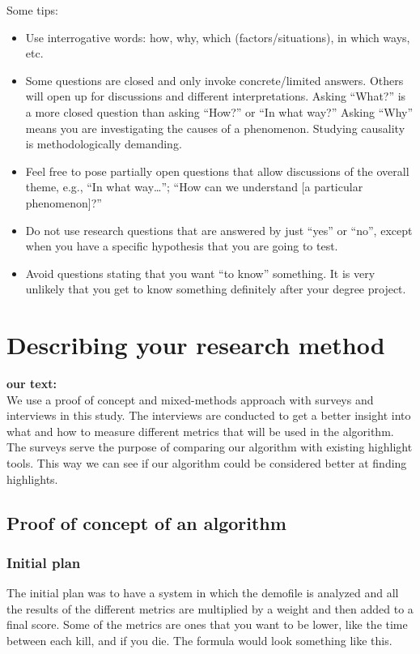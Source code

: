 \documentclass[a4paper,twoside]{bth}
\begin{document}
Some tips:
\begin{itemize}
    \item Use interrogative words: how, why, which (factors/situations), in which ways, etc.
    \item Some questions are closed and only invoke concrete/limited answers. Others will open up for discussions and different interpretations.
    Asking ``What?'' is a more closed question than asking ``How?'' or ``In what way?'' Asking ``Why'' means you are investigating the causes of a phenomenon. Studying causality is methodologically demanding.
    \item Feel free to pose partially open questions that allow discussions of the overall theme, e.g., ``In what way\dots''; ``How can we understand [a particular phenomenon]?''
    \item Do not use research questions that are answered by just ``yes'' or ``no'', except when you have a specific hypothesis that you are going to test.
    \item Avoid questions stating that you want ``to know'' something. It is very unlikely that you get to know something definitely after your degree project.
\end{itemize}


\section{Describing your research method}
\textbf{our text:}\\
We use a proof of concept and mixed-methods approach with surveys and interviews in this study. The interviews are conducted to get a better insight into what and how to measure different metrics that will be used in the algorithm. The surveys serve the purpose of comparing our algorithm with existing highlight tools. This way we can see if our algorithm could be considered better at finding highlights.
\subsection{Proof of concept of an algorithm}

\subsubsection{Initial plan}
The initial plan was to have a system in which the demofile is analyzed and all the results of the different metrics are multiplied by a weight and then added to a final score. Some of the metrics are ones that you want to be lower, like the time between each kill, and if you die. The formula would look something like this.
\end{document}
